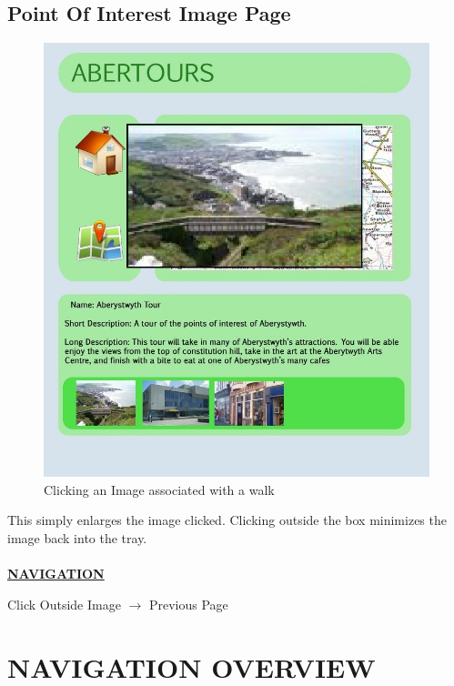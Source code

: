 \documentclass[12pt]{article}
\begin{document}
{\subsection{Point Of Interest Image Page}
\begin{figure}[htp]
\centering
\includegraphics[scale=0.50]{Project_Plan/Web/walk_image_clicked_01.jpg}
\caption{Clicking an Image associated with a walk}
\label{Clicking an Image associated with a walk}
\end{figure}
\par{This simply enlarges the image clicked. Clicking outside the box minimizes the image back into the tray. \\ \\}
\textbf{\uline{NAVIGATION}}
\par{Click Outside Image $\rightarrow$ Previous Page}
\newpage
\section{NAVIGATION OVERVIEW}
}
\end{document}
